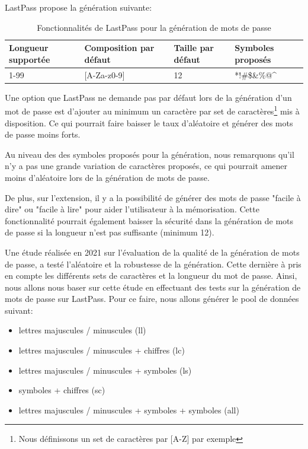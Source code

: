 LastPass propose la génération suivante:

\begin{table}[H]
	\centering
	\begin{tabular}{llll}
		\hline
		 Longueur supportée & Composition par défaut      & Taille par défaut & Symboles proposés              \\ \hline
		 1-99               & {[}A-Za-z0-9{]} & 12                & *!\#\$\&\%@\textasciicircum{} \\ \hline
	\end{tabular}
\caption{Fonctionnalités de LastPass pour la génération de mots de passe}
\end{table}

Une option que LastPass ne demande pas par défaut lors de la génération d'un mot de passe est d'ajouter au minimum un caractère par set de caractères\footnote{Nous définissons un set de caractères par [A-Z] par exemple} mis à disposition. Ce qui pourrait faire baisser le taux d'aléatoire et générer des mots de passe moins forts. 

Au niveau des des symboles proposés pour la génération, nous remarquons qu'il n'y a pas une grande variation de caractères proposés, ce qui pourrait amener moins d'aléatoire lors de la génération de mots de passe.

De plus, sur l'extension, il y a la possibilité de générer des mots de passe "facile à dire" ou "facile à lire" pour aider l'utilisateur à la mémorisation. Cette fonctionnalité pourrait également baisser la sécurité dans la génération de mots de passe si la longueur n'est pas suffisante (minimum 12). 

Une étude réalisée en 2021\cite{oesch} sur l'évaluation de la qualité de la génération de mots de passe, a testé l'aléatoire et la robustesse de la génération. Cette dernière à pris en compte les différents sets de caractères et la longueur du mot de passe. Ainsi, nous allons nous baser sur cette étude en effectuant des tests sur la génération de mots de passe sur LastPass. Pour ce faire, nous allons générer le pool de données suivant:

\begin{itemize}
	\item lettres majuscules / minuscules (ll)
	\item lettres majuscules / minuscules + chiffres (lc)
	\item lettres majuscules / minuscules + symboles (ls)
	\item symboles + chiffres (sc)
	\item lettres majuscules / minuscules + symboles + symboles (all)
\end{itemize}


